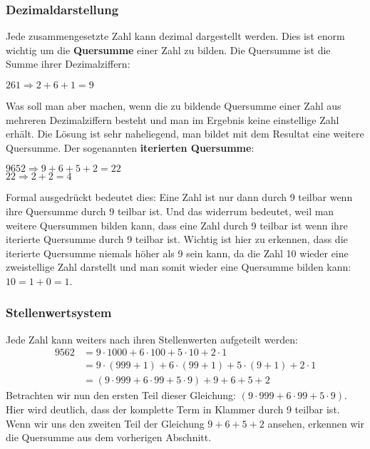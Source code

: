 \documentclass[12pt,a4paper]{article}
\theoremstyle{definition}
\begin{document}
\subsubsection{Dezimaldarstellung}
Jede zusammengesetzte Zahl kann dezimal dargestellt werden.
Dies ist enorm wichtig um die \textbf{Quersumme} einer Zahl zu bilden.
Die Quersumme ist die Summe ihrer Dezimalziffern:
\begin{center}
$261 \Rightarrow 2 + 6 +1 = 9$
\end{center}
Was soll man aber machen, wenn die zu bildende Quersumme einer Zahl aus mehreren Dezimalziffern besteht und man im Ergebnis keine einstellige Zahl erhält.
Die Lösung ist sehr naheliegend, man bildet mit dem Resultat eine weitere Quersumme.
Der sogenannten \textbf{iterierten Quersumme}:
\begin{center}
$9652 \Rightarrow 9 + 6 + 5 + 2 = 22$\\
$ 22 \Rightarrow 2 + 2 = 4$
\end{center}
Formal ausgedrückt bedeutet dies:\newline
Eine Zahl ist nur dann durch 9 teilbar wenn ihre Quersumme durch 9 teilbar ist.
Und das widerrum bedeutet, weil man weitere Quersummen bilden kann, dass eine Zahl durch 9 teilbar ist wenn ihre iterierte Quersumme durch 9 teilbar ist.
Wichtig ist hier zu erkennen, dass die iterierte Quersumme niemals höher als 9 sein kann, da die Zahl 10 wieder eine zweistellige Zahl darstellt und man somit wieder eine Quersumme bilden kann: $10 = 1 + 0 = 1$.

\subsubsection{Stellenwertsystem}
Jede Zahl kann weiters nach ihren Stellenwerten aufgeteilt werden:
\begin{align}
9562 &= 9 \cdot 1000 + 6 \cdot 100 + 5 \cdot 10 + 2 \cdot 1 \\
&= 9 \cdot (999+1) + 6 \cdot (99+1) + 5 \cdot (9+1) + 2 \cdot 1 \\
&= (9 \cdot 999 + 6 \cdot 99 + 5 \cdot 9) + 9 + 6 + 5 + 2
\end{align}
Betrachten wir nun den ersten Teil dieser Gleichung: $(9 \cdot 999 + 6 \cdot 99 + 5 \cdot 9)$.
Hier wird deutlich, dass der komplette Term in Klammer durch 9 teilbar ist.
Wenn wir uns den zweiten Teil der Gleichung $9 + 6 + 5 + 2$ ansehen, erkennen wir die Quersumme aus dem vorherigen Abschnitt.
\end{document}
